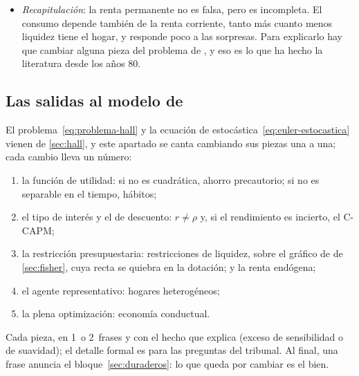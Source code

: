 \documentclass[11pt]{article}
\begin{document}
\begin{itemize}
\item \emph{Recapitulación}: la renta permanente no es falsa, pero es incompleta. El consumo depende también de la renta corriente, tanto más cuanto menos liquidez tiene el hogar, y responde poco a las sorpresas. Para explicarlo hay que cambiar alguna pieza del problema de , y eso es lo que ha hecho la literatura desde los años 80.
\end{itemize}

\subsection{Las salidas al modelo de }\label{sec:salidas}

\begin{notaopositor}
El problema~\eqref{eq:problema-hall} y la ecuación de  estocástica~\eqref{eq:euler-estocastica} vienen de \ref{sec:hall}, y este apartado se canta cambiando sus piezas una a una; cada cambio lleva un número:
\begin{enumerate}
\item la función de utilidad: si no es cuadrática, ahorro precautorio; si no es separable en el tiempo, hábitos;
\item el tipo de interés y el de descuento: $r\neq\rho$ y, si el rendimiento es incierto, el C-CAPM;
\item la restricción presupuestaria: restricciones de liquidez, sobre el gráfico de  de \ref{sec:fisher}, cuya recta se quiebra en la dotación; y la renta endógena;
\item el agente representativo: hogares heterogéneos;
\item la plena optimización: economía conductual.
\end{enumerate}
Cada pieza, en 1~o 2~frases y con el hecho que explica (exceso de sensibilidad o de suavidad); el detalle formal es para las preguntas del tribunal. Al final, una frase anuncia el bloque~\ref{sec:duraderos}: lo que queda por cambiar es el bien.
\end{notaopositor}
\end{document}
